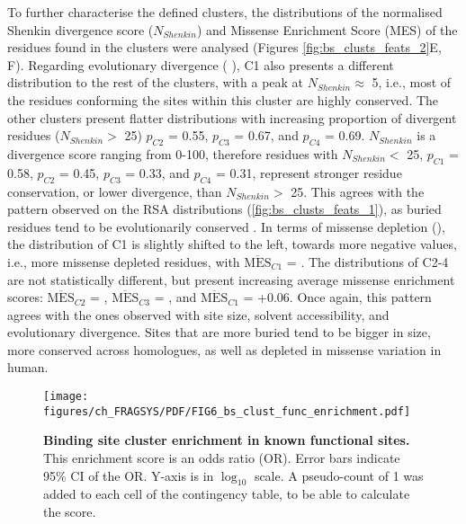 To further characterise the defined clusters, the distributions of the normalised Shenkin divergence score ($N_{Shenkin}$) and Missense Enrichment Score (MES) of the residues found in the clusters were analysed (Figures \ref{fig:bs_clusts_feats_2}E, F). Regarding evolutionary divergence ( ), C1 also presents a different distribution to the rest of the clusters, with a peak at $N_{Shenkin} \approx$ 5, i.e., most of the residues conforming the sites within this cluster are highly conserved. The other clusters present flatter distributions with increasing proportion of divergent residues ($N_{Shenkin} >$ 25) $p_{C2}$ = 0.55, $p_{C3}$ = 0.67, and $p_{C4}$ = 0.69. $N_{Shenkin}$ is a divergence score ranging from 0-100, therefore residues with $N_{Shenkin} <$ 25, $p_{C1}$ = 0.58, $p_{C2}$ = 0.45, $p_{C3}$ = 0.33, and $p_{C4}$ = 0.31, represent stronger residue conservation, or lower divergence, than $N_{Shenkin} >$ 25. This agrees with the pattern observed on the RSA distributions (\autoref{fig:bs_clusts_feats_1}), as buried residues tend to be evolutionarily conserved \cite{CHOTHIA_1986_CONSERVATION, RUSSELL_1994_UNCONSERVATION}. In terms of missense depletion (), the distribution of C1 is slightly shifted to the left, towards more negative values, i.e., more missense depleted residues, with $\overline{\text{MES}}_{C1}$ = . The distributions of C2-4 are not statistically different, but present increasing average missense enrichment scores: $\overline{\text{MES}}_{C2}$ = , $\overline{\text{MES}}_{C3}$ = , and $\overline{\text{MES}}_{C1}$ = +0.06. Once again, this pattern agrees with the ones observed with site size, solvent accessibility, and evolutionary divergence. Sites that are more buried tend to be bigger in size, more conserved across homologues, as well as depleted in missense variation in human.

\begin{figure}[htb!]
    \centering
    \texttt{[image: figures/ch\_FRAGSYS/PDF/FIG6\_bs\_clust\_func\_enrichment.pdf]}
    \caption[Binding site cluster enrichment in known functional sites]{\textbf{Binding site cluster enrichment in known functional sites.} This enrichment score is an odds ratio (OR). Error bars indicate 95\% CI of the OR. Y-axis is in $\log_{10}$ scale. A pseudo-count of 1 was added to each cell of the contingency table, to be able to calculate the score.}
    \label{fig:bs_clusts_enrichment}
\end{figure}

